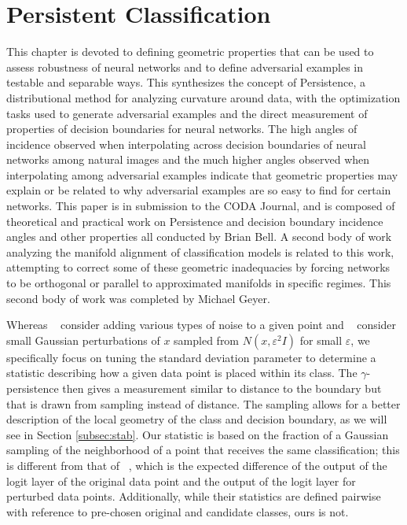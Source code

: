 \chapter{Persistent Classification}
\label{Chapter3}

This chapter is devoted to defining geometric properties
that can be used to assess robustness of neural networks and to
define adversarial examples in testable and separable
ways. This synthesizes the concept of Persistence, a distributional
method for analyzing curvature around data, with the optimization
tasks used to generate adversarial examples and the direct measurement
of properties of decision boundaries for neural networks. The high
angles of incidence observed when interpolating across decision
boundaries of neural networks among natural images and the much higher
angles observed when interpolating among adversarial examples indicate
that geometric properties may explain or be related to why adversarial
examples are so easy to find for certain networks. This paper is in
submission to the CODA Journal, and is composed of theoretical and
practical work on Persistence and decision boundary incidence angles
and other properties all conducted by Brian Bell. A second body of
work analyzing the manifold alignment of classification models is
related to this work, attempting to correct some of these geometric
inadequacies by forcing networks to be orthogonal or parallel to approximated manifolds in specific regimes. This second body of work was completed by Michael Geyer.

Whereas ~\citet{roth19aodds} consider adding various types of noise to a given point and ~\citet{hosseini2019odds} consider small Gaussian perturbations of $x$ sampled from $N(x,\varepsilon^2 I)$ for small $\varepsilon$, %
we specifically focus on %
tuning the standard deviation parameter to determine a statistic describing how a given data point is placed within its class. The $\gamma$-persistence then gives a measurement similar to distance to the boundary but that is drawn from sampling instead of distance. The sampling allows for a better description of the local geometry of the class and decision boundary, as we will see in Section \ref{subsec:stab}. Our statistic is based on the fraction of a Gaussian sampling of the neighborhood of a point that receives the same classification; this is different from that of ~\citet{roth19aodds}, which is the expected difference of the output of the logit layer of the original data point and the output of the logit layer for perturbed data points.  Additionally, while their statistics are defined pairwise with reference to pre-chosen original and candidate classes, ours is not.

